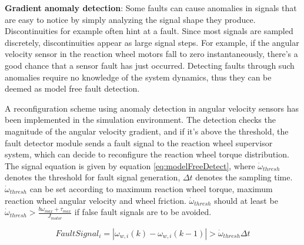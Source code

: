 \label{sec:ModelFreeFD}
\textbf{{Gradient anomaly detection}}: Some faults can cause anomalies in signals that are easy to notice by simply analyzing the signal shape they produce. Discontinuities for example often hint at a fault. Since most signals are sampled discretely, discontinuities appear as large signal steps. For example, if the angular velocity sensor in the reaction wheel motors fall to zero instantaneously, there's a good chance that a sensor fault has just occurred. Detecting faults through such anomalies require no knowledge of the system dynamics, thus they can be deemed as model free fault detection.

A reconfiguration scheme using anomaly detection in angular velocity sensors has been implemented in the simulation environment. The detection checks the magnitude of the angular velocity gradient, and if it's above the threshold, the fault detector module sends a fault signal to the reaction wheel supervisor system, which can decide to reconfigure the reaction wheel torque distribution. The signal equation is given by equation \ref{eq:modelFreeDetect}, where $\dot{\omega}_{thresh}$ denotes the threshold for fault signal generation, $\Delta t$ denotes the sampling time.  $\dot{\omega}_{thresh}$ can be set according to maximum reaction wheel torque, maximum reaction wheel angular velocity and wheel friction. $\dot{\omega}_{thresh}$ should at  least be $\dot{\omega}_{thresh} > \frac{b \omega_{max} + \tau_{max}}{J_{motor}}$ if false fault signals are to be avoided.

\begin{equation}
\label{eq:modelFreeDetect}
FaultSignal_i = |\omega_{w,i}(k) - \omega_{w,i}(k-1)| > \dot{\omega}_{thresh} \Delta t
\end{equation}




